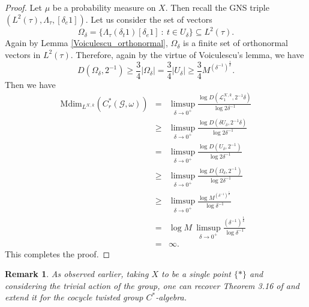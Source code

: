 \documentclass[a4paper,11pt,reqno]{amsart}
\theoremstyle{plain}
\newtheorem{rem}[thm]{Remark}
\theoremstyle{mainthmstyle}
\theoremstyle{named}
\numberwithin{equation}{section}
\newcommand{\Bea}{\begin{eqnarray*}}
\newcommand{\Eea}{\end{eqnarray*}}
\begin{document}
\begin{proof}
Let $\mu$ be a probability measure on $X.$ Then recall the GNS triple $(L^{2}(\tau),\Lambda_{\tau},[\delta_{e}1])$.
Let us consider the set of vectors $$\Omega_{\delta} = \{ \Lambda_\tau \left (\delta_t 1 \right ) [\delta_e 1]\ :\ t \in U_{\delta} \} \subseteq L^2(\tau).$$ 
Again by Lemma \ref{Voiculescu_orthonormal}, $\Omega_{\delta}$ is a finite set of orthonormal vectors in $L^{2} (\tau).$ Therefore, again by the virtue of Voiculescu's lemma, we have 
$$D \left (\Omega_{\delta}, 2^{-1} \right ) \geq \frac {3} {4} \left \lvert \Omega_{\delta} \right \rvert = \frac {3} {4} \left \lvert U_{\delta} \right \rvert \geq \frac {3} {4} M^{\left ( \delta^{-1} \right )^{\frac {1} {k}}}.$$ Then we have
\Bea \mathrm {Mdim}_{L^{\mathcal K, k}} \left (C_{r}^{\ast} (\mathcal G, \omega) \right ) & = & \limsup\limits_{\delta \to 0^{+}} \frac {\log D \left (\mathcal L^{\mathcal K, k}_{1}, 2^{-1} \delta \right )} {\log 2 \delta^{-1}} \\ & \geq & \limsup_{\delta \to 0^{+}} \frac {\log D \left (\delta U_{\delta}, 2^{-1} \delta \right )} {\log 2 \delta^{-1}} \\ & = & \limsup_{\delta \to 0^{+}} \frac {\log D \left (U_{\delta}, 2^{-1} \right )} {\log 2 \delta^{-1}} \\ & \geq & \limsup\limits_{\delta \to 0^{+}} \frac {\log D \left (\Omega_{\delta}, 2^{-1} \right )} {\log 2 \delta^{-1}} \\ & \geq & \limsup\limits_{\delta \to 0^{+}} \frac {\log M^{\left (\delta^{-1} \right )^{\frac {1} {k}}}} {\log \delta^{-1}} \\ & = & \log M\ \limsup\limits_{\delta \to 0^{+}} \frac {\left (\delta^{-1} \right )^{\frac {1} {k}}} {\log \delta^{-1}} \\ & = & \infty. 
\Eea
This completes the proof.
\end{proof}
\begin{rem}
    As observed earlier, taking $X$ to be a single point $\{\ast\}$ and considering the trivial action of the group, one can recover Theorem 3.16 of \cite{joardar2025metrics} and extend it for the cocycle twisted group $C^{\ast}$-algebra.
\end{rem}
\end{document}
